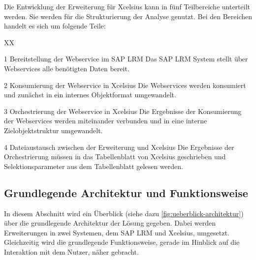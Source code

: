 \begin{onehalfspacing}
Die Entwicklung der Erweiterung für \gls{Xcelsius} kann in fünf Teilbereiche unterteilt werden. Sie werden für die Strukturierung der Analyse genutzt. Bei den Bereichen handelt es sich um folgende Teile:


\begin{seToplist} { XX }
\item[1] Bereitstellung der Webservice im SAP LRM \newline
Das SAP LRM System stellt über Webservices alle benötigten Daten bereit.

\item[2] Konsumierung der Webservice in \gls{Xcelsius} \newline
Die Webservices werden konsumiert und zunächst in ein internes Objektformat umgewandelt.

\item[3] Orchestrierung der Webservice in \gls{Xcelsius} \newline
Die Ergebnisse der Konsumierung der Webservices werden miteinander verbunden und in eine interne Zielobjektstruktur umgewandelt.

\item[4] Dateiaustausch zwischen der Erweiterung und \gls{Xcelsius} \newline
Die Ergebnisse der Orchestrierung müssen in das Tabellenblatt von \gls{Xcelsius} geschrieben und Selektionsparameter aus dem Tabellenblatt gelesen werden.

\end{seToplist}

\subsection{Grundlegende Architektur und Funktionsweise}
In diesem Abschnitt wird ein Überblick (siehe dazu \vref{fig:ueberblick-architektur}) über die grundlegende Architektur der Lösung gegeben. Dabei werden Erweiterungen in zwei Systemen, dem SAP LRM und \gls{Xcelsius}, umgesetzt. Gleichzeitig wird die grundlegende Funktionsweise, gerade im Hinblick auf die Interaktion mit dem Nutzer, näher gebracht.


\end{onehalfspacing}
